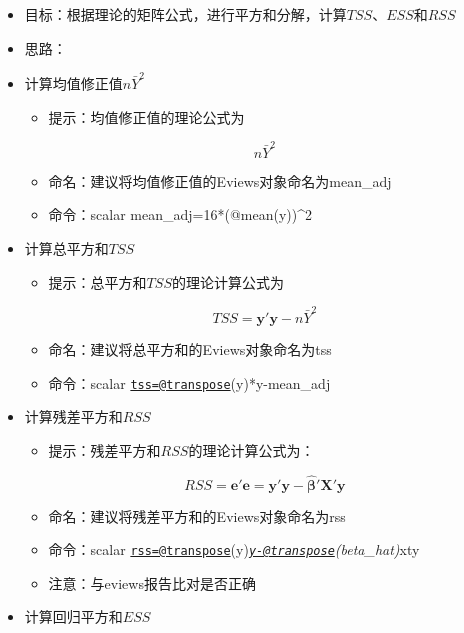 \documentclass[12pt,(landscape,a4paper),(portrait,a4paper)]{article}
\providecommand{\tightlist}{%
  \setlength{\itemsep}{0pt}\setlength{\parskip}{0pt}}
\begin{document}
\begin{itemize}
\tightlist
\item
  目标：根据理论的矩阵公式，进行平方和分解，计算\(TSS\)、\(ESS\)和\(RSS\)
\item
  思路：
\item
  计算均值修正值\(n\bar{Y}^2\)

  \begin{itemize}
  \tightlist
  \item
    提示：均值修正值的理论公式为
  \end{itemize}

  \[n\bar{Y}^2\]

  \begin{itemize}
  \item
    命名：建议将均值修正值的Eviews对象命名为mean\_adj
  \item
    命令：scalar mean\_adj=16*(@mean(y))\^{}2
  \end{itemize}
\item
  计算总平方和\(TSS\)

  \begin{itemize}
  \tightlist
  \item
    提示：总平方和\(TSS\)的理论计算公式为
  \end{itemize}

  \[TSS=\mathbf{y'y}-n\bar{Y}^2\]

  \begin{itemize}
  \item
    命名：建议将总平方和的Eviews对象命名为tss
  \item
    命令：scalar
    \href{mailto:tss=@transpose}{\nolinkurl{tss=@transpose}}(y)*y-mean\_adj
  \end{itemize}
\item
  计算残差平方和\(RSS\)

  \begin{itemize}
  \tightlist
  \item
    提示：残差平方和\(RSS\)的理论计算公式为：
  \end{itemize}

  \[RSS=\mathbf{e'e}=\mathbf{y'y-\hat{\beta}'X'y}\]

  \begin{itemize}
  \item
    命名：建议将残差平方和的Eviews对象命名为rss
  \item
    命令：scalar
    \href{mailto:rss=@transpose}{\nolinkurl{rss=@transpose}}(y)\emph{\href{mailto:y-@transpose}{\nolinkurl{y-@transpose}}(beta\_hat)}xty
  \item
    注意：与eviews报告比对是否正确
  \end{itemize}
\item
  计算回归平方和\(ESS\)


\end{itemize}
\end{document}
